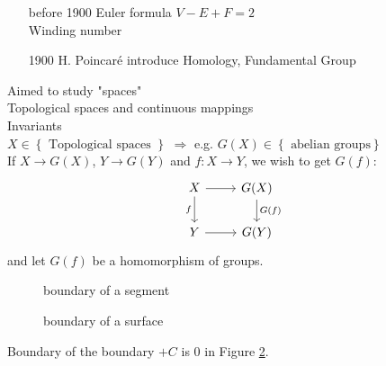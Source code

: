 \begin{enumerate}
  \item [before 1900] Euler formula $V-E+F=2$\\
    Winding number
  \item [1900] H. Poincar\'{e} introduce Homology, Fundamental Group
\end{enumerate}
Aimed to study "spaces"\\
Topological spaces and continuous mappings\\
Invariants\\
$X\in \left\{\text{ Topological spaces }\right\} $ $\Rightarrow$ e.g. $G(X) \in \left\{\text{ abelian groups}\right\} $\\
If $X\to G(X)$, $Y\to G(Y)$ and $f:X\to Y$, we wish to get $G(f)$:
\[
\begin{tikzcd}
  X\arrow{r}\arrow[swap]{d}{f} & G(X) \arrow{d}{G(f)}\\
  Y \arrow{r}{} & G(Y)
\end{tikzcd}
\]  
and let $G(f)$ be a homomorphism of groups.

\begin{figure}[ht]
    \centering
    \caption{boundary of a segment}
    \label{fig:boundary-of-a-segment}
\end{figure}
\begin{figure}[ht]
    \centering
    \caption{boundary of a surface}
    \label{fig:boundary-of-a-surface}
\end{figure}
Boundary of the boundary $+C$ is  $0$ in Figure \ref{fig:boundary-of-a-surface}.

